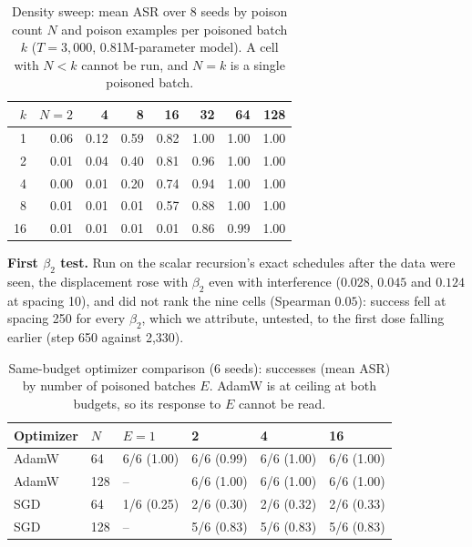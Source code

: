 \documentclass{article} %
\begin{document}
\begin{table}[ht]
\caption{Density sweep: mean ASR over 8 seeds by poison count $N$ and poison examples per poisoned batch $k$ ($T=3{,}000$, 0.81M-parameter model). A cell with $N<k$ cannot be run, and $N=k$ is a single poisoned batch.}
\label{tab:density}
\centering
\small
\begin{tabular}{rrrrrrrr}
\toprule
$k$ & $N{=}2$ & 4 & 8 & 16 & 32 & 64 & 128 \\
\midrule
1 & 0.06 & 0.12 & 0.59 & 0.82 & 1.00 & 1.00 & 1.00 \\
2 & 0.01 & 0.04 & 0.40 & 0.81 & 0.96 & 1.00 & 1.00 \\
4 & 0.00 & 0.01 & 0.20 & 0.74 & 0.94 & 1.00 & 1.00 \\
8 & 0.01 & 0.01 & 0.01 & 0.57 & 0.88 & 1.00 & 1.00 \\
16 & 0.01 & 0.01 & 0.01 & 0.01 & 0.86 & 0.99 & 1.00 \\
\bottomrule
\end{tabular}
\end{table}

\textbf{First $\beta_2$ test.} Run on the scalar recursion's exact schedules after the data were seen, the
displacement rose with $\beta_2$ even with interference ($0.028$, $0.045$ and $0.124$ at spacing 10),
and did not rank the nine cells (Spearman $0.05$): success fell at spacing 250 for every $\beta_2$,
which we attribute, untested, to the first dose falling earlier (step 650 against 2{,}330).

\begin{table}[ht]
\caption{Same-budget optimizer comparison (6 seeds): successes (mean ASR) by number of poisoned batches $E$. AdamW is at ceiling at both budgets, so its response to $E$ cannot be read.}
\label{tab:matched}
\centering
\small
\begin{tabular}{llllll}
\toprule
Optimizer & $N$ & $E{=}1$ & 2 & 4 & 16 \\
\midrule
AdamW & 64 & 6/6 (1.00) & 6/6 (0.99) & 6/6 (1.00) & 6/6 (1.00) \\
AdamW & 128 & -- & 6/6 (1.00) & 6/6 (1.00) & 6/6 (1.00) \\
SGD & 64 & 1/6 (0.25) & 2/6 (0.30) & 2/6 (0.32) & 2/6 (0.33) \\
SGD & 128 & -- & 5/6 (0.83) & 5/6 (0.83) & 5/6 (0.83) \\
\bottomrule
\end{tabular}
\end{table}
\end{document}
